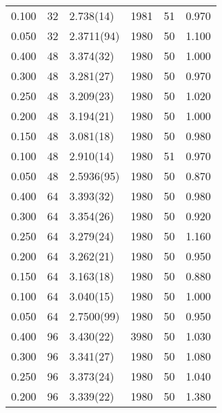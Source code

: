 \begin{tabular}{rrlrrr}
 0.100 &      32 & 2.738(14)  &                 1981 &                   51 &    0.970 \\
 0.050 &      32 & 2.3711(94) &                 1980 &                   50 &    1.100 \\
 0.400 &      48 & 3.374(32)  &                 1980 &                   50 &    1.000 \\
 0.300 &      48 & 3.281(27)  &                 1980 &                   50 &    0.970 \\
 0.250 &      48 & 3.209(23)  &                 1980 &                   50 &    1.020 \\
 0.200 &      48 & 3.194(21)  &                 1980 &                   50 &    1.000 \\
 0.150 &      48 & 3.081(18)  &                 1980 &                   50 &    0.980 \\
 0.100 &      48 & 2.910(14)  &                 1980 &                   51 &    0.970 \\
 0.050 &      48 & 2.5936(95) &                 1980 &                   50 &    0.870 \\
 0.400 &      64 & 3.393(32)  &                 1980 &                   50 &    0.980 \\
 0.300 &      64 & 3.354(26)  &                 1980 &                   50 &    0.920 \\
 0.250 &      64 & 3.279(24)  &                 1980 &                   50 &    1.160 \\
 0.200 &      64 & 3.262(21)  &                 1980 &                   50 &    0.950 \\
 0.150 &      64 & 3.163(18)  &                 1980 &                   50 &    0.880 \\
 0.100 &      64 & 3.040(15)  &                 1980 &                   50 &    1.000 \\
 0.050 &      64 & 2.7500(99) &                 1980 &                   50 &    0.950 \\
 0.400 &      96 & 3.430(22)  &                 3980 &                   50 &    1.030 \\
 0.300 &      96 & 3.341(27)  &                 1980 &                   50 &    1.080 \\
 0.250 &      96 & 3.373(24)  &                 1980 &                   50 &    1.040 \\
 0.200 &      96 & 3.339(22)  &                 1980 &                   50 &    1.380 \\

\end{tabular}

